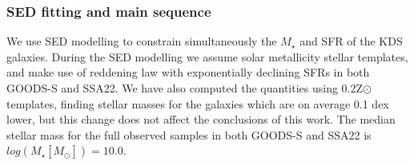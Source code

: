 \documentclass[fleqn,usenatbib]{mn2e}
\begin{document}
\subsubsection{SED fitting and main sequence}\label{subsubsec:sed_fitting}
We use SED modelling to constrain simultaneously the $M_{\star}$ and SFR of the KDS galaxies.
During the SED modelling we assume solar metallicity stellar templates, and make use of \cite{Calzetti2000} reddening law with exponentially declining SFRs in both GOODS-S and SSA22.
We have also computed the quantities using 0.2Z$\odot$ templates, finding stellar masses for the galaxies which are on average 0.1 dex lower, but this change does not affect the conclusions of this work.
The median stellar mass for the full observed samples in both GOODS-S and SSA22 is $log(M_{\star}[M_{\odot}]) = 10.0$.
\end{document}
